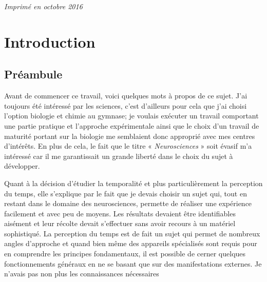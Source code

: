\documentclass[12pt,fleqn,oneside,openany]{book} %
\begin{document}
\noindent \textit{Imprimé en octobre 2016} 



\pagestyle{empty} %

\tableofcontents %


\pagestyle{fancy} %



\chapter{Introduction} \label{cha:introduction}
\section{Préambule}
Avant de commencer ce travail, voici quelques mots à propos de ce sujet. J'ai toujours été intéressé par les sciences, c'est d'ailleurs pour cela que j'ai choisi l'option biologie et chimie au gymnase; je voulais exécuter un travail comportant une partie pratique et l'approche expérimentale ainsi que le choix d'un travail de maturité portant sur la biologie me semblaient donc approprié avec mes centres d'intérêts. En plus de cela, le fait que le titre « \emph{Neurosciences} » soit évasif m'a intéressé car il me garantissait un grande liberté dans le choix du sujet à développer.

Quant à la décision d'étudier la temporalité et plus particulièrement la perception du temps, elle s'explique par le fait que je devais choisir un sujet qui, tout en restant dans le domaine des neurosciences, permette de réaliser une expérience facilement et avec peu de moyens. Les résultats devaient être identifiables aisément et leur récolte devait s'effectuer sans avoir recours à un matériel sophistiqué. La perception du temps est de fait un sujet qui permet de nombreux angles d'approche et quand bien même des appareils spécialisés sont requis pour en comprendre les principes fondamentaux, il est possible de cerner quelques fonctionnements généraux en ne se basant que sur des manifestations externes. Je n'avais pas non plus les connaissances nécessaires 
\end{document}
